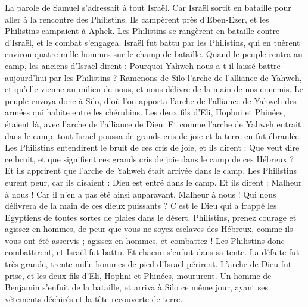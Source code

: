 \begin{multicols}{2}
\VerseOne{}La parole de Samuel s'adressait à tout Israël. Car Israël sortit en bataille pour aller à la rencontre des Philistins. Ils campèrent près d'Eben-Ezer, et les Philistins campaient à Aphek.
Les Philistins se rangèrent en bataille contre d'Israël, et le combat s'engagea. Israël fut battu par les Philistins, qui en tuèrent environ quatre mille hommes sur le champ de bataille.
Quand le peuple rentra au camp, les anciens d'Israël dirent : Pourquoi Yahweh nous a-t-il laissé battre aujourd'hui par les Philistins ? Ramenons de Silo l'arche de l'alliance de Yahweh, et qu'elle vienne au milieu de nous, et nous délivre de la main de nos ennemis.
Le peuple envoya donc à Silo, d'où l'on apporta l'arche de l'alliance de Yahweh des armées qui habite entre les chérubins. Les deux fils d'Eli, Hophni et Phinées, étaient là, avec l'arche de l'alliance de Dieu.
Et comme l'arche de Yahweh entrait dans le camp, tout Israël poussa de grands cris de joie et la terre en fut ébranlée.
Les Philistins entendirent le bruit de ces cris de joie, et ils dirent : Que veut dire ce bruit, et que signifient ces grands cris de joie dans le camp de ces Hébreux ? Et ils apprirent que l'arche de Yahweh était arrivée dans le camp.
Les Philistins eurent peur, car ils disaient : Dieu est entré dans le camp. Et ils dirent : Malheur à nous ! Car il n'en a pas été ainsi auparavant.
Malheur à nous ! Qui nous délivrera de la main de ces dieux puissants ? C'est le Dieu qui a frappé les Egyptiens de toutes sortes de plaies dans le désert.
Philistins, prenez courage et agissez en hommes, de peur que vous ne soyez esclaves des Hébreux, comme ils vous ont été asservis ; agissez en hommes, et combattez !
Les Philistins donc combattirent, et Israël fut battu. Et chacun s'enfuit dans sa tente. La défaite fut très grande, trente mille hommes de pied d'Israël périrent.
L'arche de Dieu fut prise, et les deux fils d'Eli, Hophni et Phinées, moururent.
Un homme de Benjamin s'enfuit de la bataille, et arriva à Silo ce même jour, ayant ses vêtements déchirés et la tête recouverte de terre.

\end{multicols}
